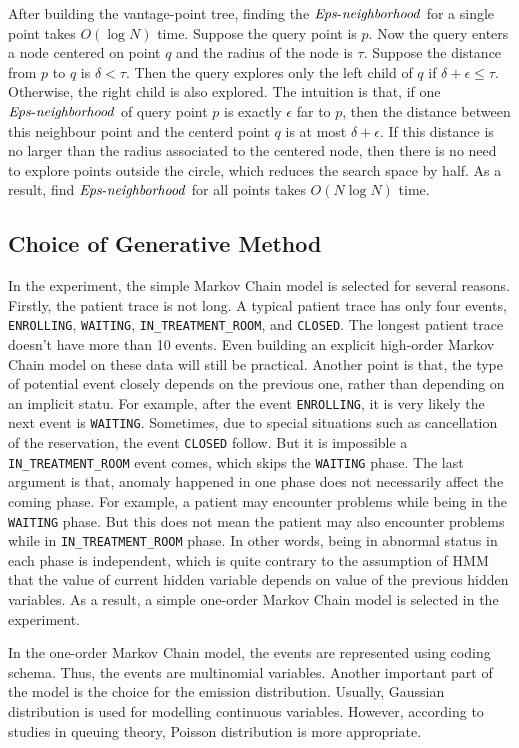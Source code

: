 After building the vantage-point tree, finding the $\id{Eps-neighborhood}$ for a single point takes $O(\log N)$ time. Suppose the query point is $p$. Now the query enters a node centered on point $q$ and the radius of the node is $\tau$. Suppose the distance from $p$ to $q$ is $\delta < \tau$. Then the query explores only the left child of $q$ if $\delta + \epsilon \leq \tau$. Otherwise, the right child is also explored. The intuition is that, if one $\id{Eps-neighborhood}$ of query point $p$ is exactly $\epsilon$ far to $p$, then the distance between this neighbour point and the centerd point $q$ is at most $\delta + \epsilon$. If this distance is no larger than the radius associated to the centered node, then there is no need to explore points outside the circle, which reduces the search space by half. As a result, find $\id{Eps-neighborhood}$ for all points takes $O(N \log N)$ time. 

\subsection{Choice of Generative Method}
In the experiment, the simple Markov Chain model is selected for several reasons. Firstly, the patient trace is not long. A typical patient trace has only four events, \texttt{ENROLLING}, \texttt{WAITING}, \texttt{IN\_TREATMENT\_ROOM}, and \texttt{CLOSED}. The longest patient trace doesn't have more than 10 events. Even building an explicit high-order Markov Chain model on these data will still be practical. Another point is that, the type of potential event closely depends on the previous one, rather than depending on an implicit statu. For example, after the event \texttt{ENROLLING}, it is very likely the next event is \texttt{WAITING}. Sometimes, due to special situations such as cancellation of the reservation, the event \texttt{CLOSED} follow. But it is impossible a \texttt{IN\_TREATMENT\_ROOM} event comes, which skips the \texttt{WAITING} phase. The last argument is that, anomaly happened in one phase does not necessarily affect the coming phase. For example, a patient may encounter problems while being in the \texttt{WAITING} phase. But this does not mean the patient may also encounter problems while in \texttt{IN\_TREATMENT\_ROOM} phase. In other words, being in abnormal status in each phase is independent, which is quite contrary to the assumption of HMM that the value of current hidden variable depends on value of the previous hidden variables. As a result, a simple one-order Markov Chain model is selected in the experiment.

In the one-order Markov Chain model, the events are represented using  coding schema. Thus, the events are multinomial variables. Another important part of the model is the choice for the emission distribution. Usually, Gaussian distribution is used for modelling continuous variables. However, according to studies in queuing theory, Poisson distribution is more appropriate. 